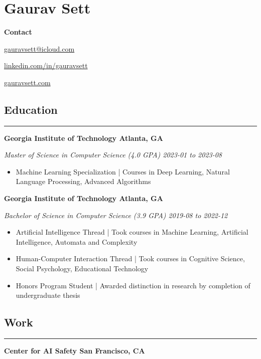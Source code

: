 \documentclass{article}
\newcommand{\headingOne}[1]{
    \subsection*{#1} \hrule
    \vspace*{6pt}
}
\newcommand{\headingTwo}[2]{
    \vspace*{6pt}
    \textbf{#1 \hfill #2}
}
\newcommand{\headingThree}[2]{
    \vspace*{2pt}
    \textsl{#1 \hfill #2}
}
\begin{document}
\section*{Gaurav Sett}

\textbf{Contact}
\begin{itemize*}[label=$|$]
    \item \href{mailto:gauravsett@icloud.com}{gauravsett@icloud.com}
    \item \href{https://linkedin.com/in/gauravsett}{linkedin.com/in/gauravsett}
    \item \href{https://gauravsett.com}{gauravsett.com}
\end{itemize*}






\headingOne{Education}


\headingTwo{Georgia Institute of Technology}{Atlanta, GA}

\headingThree{Master of Science in Computer Science (4.0 GPA)}{2023-01 to 2023-08}
\begin{itemize}
    \item Machine Learning Specialization | Courses in Deep Learning, Natural Language Processing, Advanced Algorithms
\end{itemize}


\headingTwo{Georgia Institute of Technology}{Atlanta, GA}

\headingThree{Bachelor of Science in Computer Science (3.9 GPA)}{2019-08 to 2022-12}
\begin{itemize}
    \item Artificial Intelligence Thread | Took courses in Machine Learning, Artificial Intelligence, Automata and Complexity
    \item Human-Computer Interaction Thread | Took courses in Cognitive Science, Social Psychology, Educational Technology
    \item Honors Program Student | Awarded distinction in research by completion of undergraduate thesis
\end{itemize}



\headingOne{Work}


\headingTwo{Center for AI Safety}{San Francisco, CA}
\end{document}
